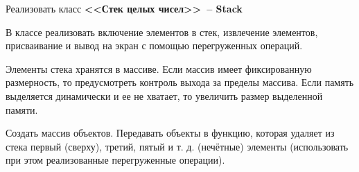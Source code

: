 Реализовать класс \textbf{<<Стек целых чисел>>~-- Stack}

В классе реализовать включение элементов в стек,
извлечение элементов, присваивание и вывод на экран с помощью перегруженных
операций.

Элементы стека хранятся в массиве. Если массив имеет фиксированную
размерность, то предусмотреть контроль выхода за пределы массива. Если память
выделяется динамически и ее не хватает, то увеличить размер выделенной памяти.

Создать
массив объектов. Передавать объекты в функцию, которая удаляет из стека первый
(сверху), третий, пятый и т. д. (нечётные) элементы (использовать при этом реализованные
перегруженные операции).
